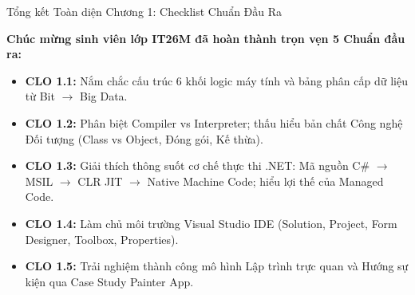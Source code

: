 \documentclass[aspectratio=169, 10pt]{beamer}
\begin{document}
\begin{frame}{Tổng kết Toàn diện Chương 1: Checklist Chuẩn Đầu Ra}
  \begin{exampleblock}{\textbf{Chúc mừng sinh viên lớp IT26M đã hoàn thành trọn vẹn 5 Chuẩn đầu ra:}}
    \begin{itemize}
      \item[$\checkmark$] \textbf{CLO 1.1:} Nắm chắc cấu trúc 6 khối logic máy tính và bảng phân cấp dữ liệu từ Bit $\to$ Big Data.
      \item[$\checkmark$] \textbf{CLO 1.2:} Phân biệt Compiler vs Interpreter; thấu hiểu bản chất Công nghệ Đối tượng (Class vs Object, Đóng gói, Kế thừa).
      \item[$\checkmark$] \textbf{CLO 1.3:} Giải thích thông suốt cơ chế thực thi .NET: Mã nguồn C\# $\to$ MSIL $\to$ CLR JIT $\to$ Native Machine Code; hiểu lợi thế của Managed Code.
      \item[$\checkmark$] \textbf{CLO 1.4:} Làm chủ môi trường Visual Studio IDE (Solution, Project, Form Designer, Toolbox, Properties).
      \item[$\checkmark$] \textbf{CLO 1.5:} Trải nghiệm thành công mô hình Lập trình trực quan và Hướng sự kiện qua Case Study Painter App.
    \end{itemize}
  \end{exampleblock}
\end{frame}
\end{document}
